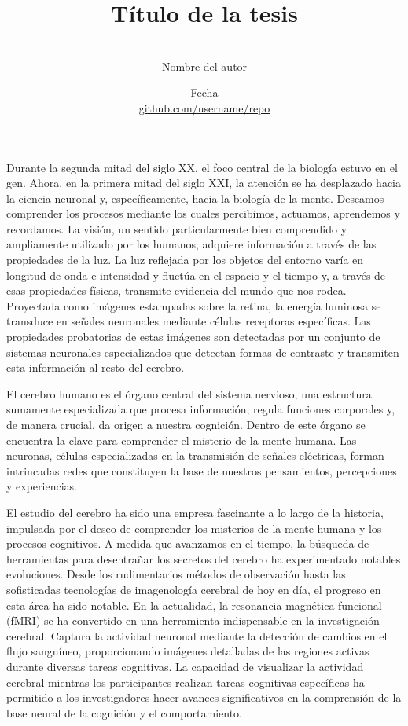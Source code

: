 \documentclass[12pt,oneside]{uhthesis}
\title{Título de la tesis}
\author{\\\vspace{0.25cm}Nombre del autor}
\date{Fecha\\\vspace{0.25cm}\href{https://github.com/username/repo}{github.com/username/repo}}
\begin{document}
\frontmatter
\maketitle







\mainmatter

Durante la segunda mitad del siglo XX, el foco central de la biología estuvo en el gen. Ahora, en la primera mitad del siglo XXI, la atención se ha desplazado hacia la ciencia neuronal y, específicamente, hacia la biología de la mente. Deseamos comprender los procesos mediante los cuales percibimos, actuamos, aprendemos y recordamos.
La visión, un sentido particularmente bien comprendido y ampliamente utilizado por los humanos, adquiere información a través de las propiedades de la luz. La luz reflejada por los objetos del entorno varía en longitud de onda e intensidad y fluctúa en el espacio y el tiempo y, a través de esas propiedades físicas, transmite evidencia del mundo que nos rodea. Proyectada como imágenes estampadas sobre la retina, la energía luminosa se transduce en señales neuronales mediante células receptoras específicas. Las propiedades probatorias de estas imágenes son detectadas por un conjunto de sistemas neuronales especializados que detectan formas de contraste y transmiten esta información al resto del cerebro.



El cerebro humano es el órgano central del sistema nervioso, una estructura sumamente especializada que procesa información, regula funciones corporales y, de manera crucial, da origen a nuestra cognición. Dentro de este órgano se encuentra la clave para comprender el misterio de la mente humana. Las neuronas, células especializadas en la transmisión de señales eléctricas, forman intrincadas redes que constituyen la base de nuestros pensamientos, percepciones y experiencias.

El estudio del cerebro ha sido una empresa fascinante a lo largo de la historia, impulsada por el deseo de comprender los misterios de la mente humana y los procesos cognitivos. A medida que avanzamos en el tiempo, la búsqueda de herramientas para desentrañar los secretos del cerebro ha experimentado notables evoluciones. Desde los rudimentarios métodos de observación hasta las sofisticadas tecnologías de imagenología cerebral de hoy en día, el progreso en esta área ha sido notable. En la actualidad, la resonancia magnética funcional (fMRI) se ha convertido en una herramienta indispensable en la investigación cerebral. Captura la actividad neuronal mediante la detección de cambios en el flujo sanguíneo, proporcionando imágenes detalladas de las regiones activas durante diversas tareas cognitivas. La capacidad de visualizar la actividad cerebral mientras los participantes realizan tareas cognitivas específicas ha permitido a los investigadores hacer avances significativos en la comprensión de la base neural de la cognición y el comportamiento.
\end{document}
